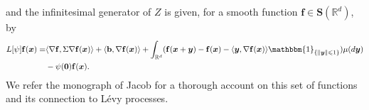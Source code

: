 \documentclass[12pt]{amsart}
\newcommand{\hlabel}{\phantomsection\label}
\newcommand{\hptg}[2]{\hypertarget{#1}{#2}}
\numberwithin{equation}{section}
\newcommand{\bb}{\mathbb}
\renewcommand{\ge}{\geqslant}
\renewcommand{\le}{\leqslant}
\newcommand{\bbm}{\mathbbm}
\newcommand{\B}{\mathbf{B}}
\newcommand{\f}{\mathbf{f}}
\theoremstyle{definition}
\theoremstyle{assump}
\theoremstyle{remark}
\newtheorem{rem}[thm]{Remark}
\begin{document}
and the infinitesimal generator of $Z$ is given, for a smooth function \hptg{C20}{$\f \in \mathbf{S}(\bb{R}^d)$}, by
\begin{align*}
L[\psi]\f(\bm{x})=&\langle\nabla\f,\Sigma\nabla \f(\bm{x})\rangle+\langle\mathbf{b},\nabla\f(\bm{x})\rangle +\int_{\bb{R}^d}(\f(\bm{x}+\bm{y})-\f(\bm{x})-\langle\bm{y}, \nabla\f(\bm{x})\rangle\bbm{1}_{\{\|\bm{y}\|\le 1\}})\mu(d\bm{y})\\ &-\psi(\bm{0})\f(\bm{x}).
\end{align*}
We refer the monograph of Jacob \cite{Jacob} for a thorough account on this set of functions and its connection to L\'evy processes.
\end{document}
